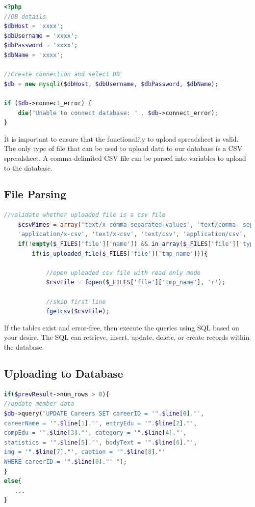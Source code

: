 \documentclass[onecolumn, draftclsnofoot,10pt, compsoc]{IEEEtran}
\begin{document}
\begin{lstlisting}[language=PHP]
<?php
//DB details
$dbHost = 'xxxx';
$dbUsername = 'xxxx';
$dbPassword = 'xxxx';
$dbName = 'xxxx';

//Create connection and select DB
$db = new mysqli($dbHost, $dbUsername, $dbPassword, $dbName);

if ($db->connect_error) {
    die("Unable to connect database: " . $db->connect_error);
}
\end{lstlisting}

\noindent It is important to ensure that the functionality to upload spreadsheet is valid. The only type of file that can be used to upload data to our database is a CSV spreadsheet. A comma-delimited CSV file can be parsed into variables to upload to the database.
\subsection{File Parsing}
\begin{lstlisting}[language=PHP]
//validate whether uploaded file is a csv file
    $csvMimes = array('text/x-comma-separated-values', 'text/comma-	separated-values', 'application/octet-stream', 'application/vnd.ms-excel', 
    'application/x-csv', 'text/x-csv', 'text/csv', 'application/csv', 'application/excel', 'application/vnd.msexcel', 'text/plain');
    if(!empty($_FILES['file']['name']) && in_array($_FILES['file']['type'],$csvMimes)){
        if(is_uploaded_file($_FILES['file']['tmp_name'])){
            
            //open uploaded csv file with read only mode
            $csvFile = fopen($_FILES['file']['tmp_name'], 'r');
            
            //skip first line
            fgetcsv($csvFile);
\end{lstlisting}

\noindent If the tables exist and error-free, then execute the queries using SQL based on your desire. The SQL can retrieve, insert, update, delete, or create records within the database. 
\subsection{Uploading to Database}
\begin{lstlisting}[language=PHP]
if($prevResult->num_rows > 0){
//update member data
$db->query("UPDATE Careers SET careerID = '".$line[0]."',
careerName = '".$line[1]."', entryEdu = '".$line[2]."',
compEdu = '".$line[3]."', category = '".$line[4]."', 
statistics = '".$line[5]."', bodyText = '".$line[6]."',
img = '".$line[7]."', caption = '".$line[8]."'
WHERE careerID = '".$line[0]."' ");
}
else{
   ...
}
\end{lstlisting}
\end{document}
